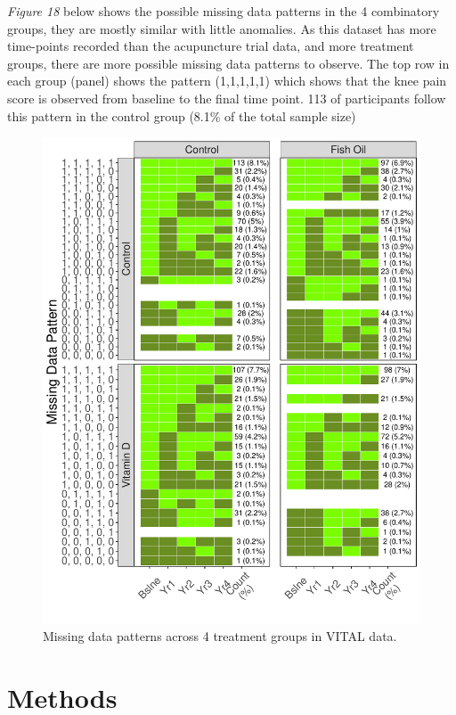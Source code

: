 \documentclass{article}
\begin{document}
\emph{Figure 18} below shows the possible missing data patterns in the 4
combinatory groups, they are mostly similar with little anomalies. As
this dataset has more time-points recorded than the acupuncture trial
data, and more treatment groups, there are more possible missing data
patterns to observe. The top row in each group (panel) shows the pattern
(1,1,1,1,1) which shows that the knee pain score is observed from
baseline to the final time point. 113 of participants follow this
pattern in the control group (8.1\% of the total sample size)

\begin{figure}

{\centering \includegraphics{Final_Report_files/figure-latex/unnamed-chunk-23-1} 

}

\caption{Missing data patterns across 4 treatment groups in VITAL data.}\label{fig:unnamed-chunk-23}
\end{figure}

\section{Methods}\label{methods}
\end{document}
